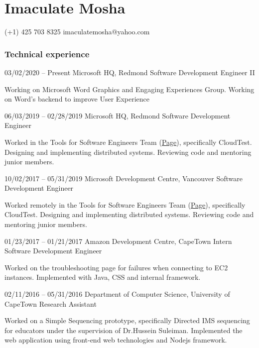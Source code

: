 \documentclass[fontsize=9pt]{tccv}
\begin{document}
\part{Imaculate Mosha}

    {(+1) 425 703 8325}
    {imaculatemosha@yahoo.com}

\section{Technical experience}

\begin{eventlist}
\item{03/02/2020 -- Present}
	{Microsoft HQ, Redmond}
	 {Software Development Engineer II}

Working on Microsoft Word Graphics and Engaging Experiences Group.
Working on Word's backend to improve User Experience


\item{06/03/2019 -- 02/28/2019}
	 {Microsoft HQ, Redmond}
	 {Software Development Engineer}
	 
Worked in the Tools for Software Engineers Team (\href{ https://www.microsoft.com/en-us/research/project/tools-for-software-engineers/}{Page}), specifically CloudTest.
Designing and implementing distributed systems.
Reviewing code and mentoring junior members.

\item{10/02/2017 -- 05/31/2019}
	 {Microsoft Development Centre, Vancouver}
	 {Software Development Engineer}
	 
Worked remotely in the Tools for Software Engineers Team (\href{ https://www.microsoft.com/en-us/research/project/tools-for-software-engineers/}{Page}), specifically CloudTest.
Designing and implementing distributed systems.
Reviewing code and mentoring junior members.


\item{01/23/2017 -- 01/21/2017}
	 {Amazon Development Centre, CapeTown}
	 {Intern Software Development Engineer}
	 
Worked on the troubleshooting page for failures when connecting to EC2 instances.
Implemented with Java, CSS and internal framework.


\item{02/11/2016 -- 05/31/2016}
	 {Department of Computer Science, University of CapeTown}
	 {Research Assistant}
	 
Worked on a Simple Sequencing prototype, specifically Directed IMS sequencing for educators under the supervision of Dr.Hussein Suleiman.  
Implemented the web application using front-end web technologies and Nodejs framework. 



\end{eventlist}
\end{document}
